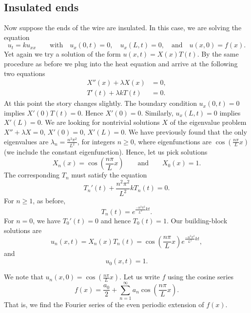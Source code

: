 \subsection{Insulated ends}

Now suppose the ends of the wire are insulated.  In this case, we are solving
the equation
\begin{equation*}
u_t = k u_{xx}
\qquad \text{with} \quad
u_x(0,t) = 0, \quad u_x(L,t) = 0,
\quad \text{and} \quad u(x,0) = f(x) .
\end{equation*}
Yet again we try a solution of the form $u(x,t) = X(x)T(t)$.  By the same
procedure as before we plug into the heat equation and arrive at the
following
two equations
\begin{align*}
X''(x) + \lambda X(x) &= 0 , \\
T'(t) + \lambda k T(t) &= 0 .
\end{align*}
At this point the story changes slightly.
The boundary condition $u_x(0,t) = 0$ implies $X'(0)T(t) = 0$.
Hence $X'(0) = 0$.  Similarly, $u_x(L,t) = 0$ implies $X'(L) = 0$.  We
are looking for nontrivial solutions $X$ of the eigenvalue problem
$X'' + \lambda X = 0$, $X'(0) = 0$, $X'(L) = 0$.  We have previously found that
the only eigenvalues are $\lambda_n = \frac{n^2 \pi^2}{L^2}$, for integers
$n \geq 0$,
where eigenfunctions are $\cos \left( \frac{n \pi}{L} x\right)$
(we include the constant
eigenfunction).  Hence, let us pick
solutions
\begin{equation*}
X_n (x) = \cos \left( \frac{n \pi}{L} x \right)
\qquad \text{and} \qquad
X_0 (x) = 1.
\end{equation*}
The corresponding $T_n$ must satisfy the equation
\begin{equation*}
T_n'(t) + \frac{n^2 \pi^2}{L^2} k T_n(t) = 0 .
\end{equation*}
For $n \geq 1$, as before,
\begin{equation*}
T_n(t) = e^{\frac{-n^2 \pi^2}{L^2} k t} .
\end{equation*}
For $n = 0$, we have $T_0'(t) = 0$ and hence $T_0(t) = 1$.
Our building-block solutions are
\begin{equation*}
u_n(x,t) = X_n(x)T_n(t) =
\cos \left( \frac{n \pi}{L} x \right)
e^{\frac{-n^2 \pi^2}{L^2} k t} ,
\end{equation*}
and
\begin{equation*}
u_0(x,t) = 1 .
\end{equation*}

We note that $u_n(x,0) = \cos \left( \frac{n \pi}{L} x \right)$.  Let us
write $f$ using the cosine series
\begin{equation*}
f(x) = \frac{a_0}{2} + \sum_{n=1}^\infty a_n \cos \left( \frac{n \pi}{L} x
\right) .
\end{equation*}
That is, we find the Fourier series of the even periodic extension of $f(x)$.

